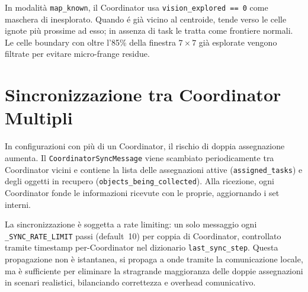 In modalit\`a \texttt{map\_known}, il Coordinator usa \texttt{vision\_explored == 0}
come maschera di inesplorato. Quando \'e gi\`a vicino al centroide, tende verso le
celle ignote pi\`u prossime ad esso; in assenza di task le tratta come frontiere
normali. Le celle boundary con oltre l'85\% della finestra $7\times7$ gi\`a esplorate
vengono filtrate per evitare micro-frange residue.

\section{Sincronizzazione tra Coordinator Multipli}

In configurazioni con pi\`u di un Coordinator, il rischio di doppia assegnazione aumenta.
Il \texttt{CoordinatorSyncMessage} viene scambiato periodicamente tra Coordinator vicini
e contiene la lista delle assegnazioni attive (\texttt{assigned\_tasks}) e degli oggetti
in recupero \linebreak[2](\texttt{objects\_being\_collected}). Alla ricezione, ogni Coordinator fonde
le informazioni ricevute con le proprie, aggiornando i set interni.

La sincronizzazione \`e soggetta a rate limiting: un solo messaggio ogni
\texttt{\_SYNC\_RATE\_LIMIT} passi (default~10) per coppia di Coordinator,
controllato tramite timestamp per-Coordinator nel dizionario \texttt{last\_sync\_step}.
Questa propagazione non \`e istantanea, si propaga a onde tramite la comunicazione
locale, ma \`e sufficiente per eliminare la stragrande maggioranza delle doppie
assegnazioni in scenari realistici, bilanciando correttezza e overhead comunicativo.
